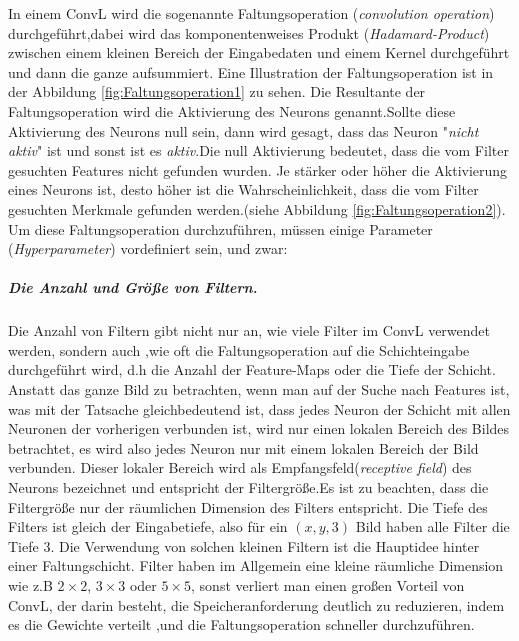\documentclass[12pt,a4paper]{scrartcl}
\numberwithin{equation}{section}
\begin{document}
In einem \ac{ConvL} wird die sogenannte Faltungsoperation (\emph{convolution operation}) durchgeführt,dabei wird das komponentenweises Produkt (\textit{Hadamard-Product}) zwischen einem kleinen Bereich der Eingabedaten und einem Kernel durchgeführt und dann die ganze aufsummiert. Eine Illustration der Faltungsoperation ist in der Abbildung  \ref{fig:Faltungsoperation1} zu sehen. Die Resultante der Faltungsoperation wird die Aktivierung des Neurons genannt.Sollte diese Aktivierung des Neurons null sein, dann wird gesagt, dass das Neuron "\textit{nicht aktiv}"{} ist und sonst ist es \textit{aktiv}.Die null Aktivierung bedeutet, dass die vom Filter gesuchten Features nicht gefunden wurden. Je stärker oder höher die Aktivierung eines Neurons ist, desto höher ist die Wahrscheinlichkeit, dass die vom Filter gesuchten Merkmale gefunden werden.(siehe Abbildung \ref{fig:Faltungsoperation2}). Um diese Faltungsoperation durchzuführen, müssen einige Parameter (\textit{Hyperparameter}) vordefiniert sein, und zwar:

\subparagraph{Die Anzahl und Größe von Filtern.}
	Die Anzahl von Filtern gibt nicht nur an, wie viele Filter im \ac{ConvL} verwendet werden, sondern auch ,wie oft die Faltungsoperation auf die Schichteingabe durchgeführt wird, d.h die Anzahl der Feature-Maps oder die Tiefe der Schicht. Anstatt das ganze Bild zu betrachten, wenn man auf der Suche nach Features ist, was mit der Tatsache gleichbedeutend ist, dass jedes Neuron der Schicht mit allen Neuronen der vorherigen verbunden ist, wird nur einen lokalen Bereich des Bildes betrachtet, es wird also jedes Neuron nur mit einem lokalen Bereich der Bild verbunden. Dieser lokaler Bereich wird als Empfangsfeld(\emph{receptive field}) des Neurons bezeichnet und entspricht der Filtergröße.Es ist zu beachten, dass die Filtergröße nur der räumlichen Dimension des Filters entspricht. Die Tiefe des Filters ist gleich der Eingabetiefe, also für ein $ (x, y, 3) $ Bild haben alle Filter die Tiefe $ 3 $.	Die Verwendung von solchen kleinen Filtern ist die Hauptidee hinter einer Faltungschicht. Filter haben im Allgemein eine kleine räumliche Dimension wie z.B $ 2\times 2 $, $3 \times3 $  oder  $5 \times 5$, sonst verliert man einen großen Vorteil von \ac{ConvL}, der darin besteht, die Speicheranforderung deutlich zu reduzieren, indem es die Gewichte verteilt ,und die Faltungsoperation schneller durchzuführen. 
	
\end{document}
